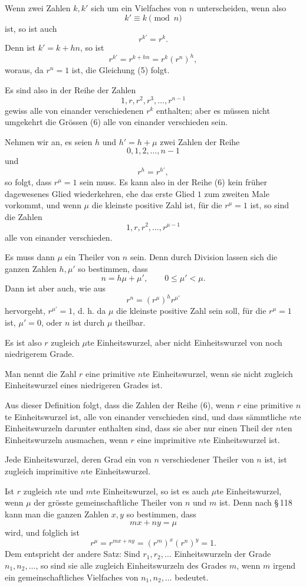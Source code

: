 \documentclass[11pt]{article}
\begin{document}
Wenn zwei Zahlen $k,k'$ sich um ein Vielfaches von $n$ unterscheiden, wenn also
\[
\tag{4}        k'
\equiv k \pmod n
\]
ist, so ist auch
\[
\tag{5}        r^{k'}=r^k.
\]
Denn ist $k'=k+hn$, so ist
\[
        r^{k'}=r^{k+hn}=r^k(r^n)^h,
\]
woraus, da $r^n=1$ ist, die Gleichung (5) folgt.

Es sind also in der Reihe der Zahlen
\[
\tag{6}        1,r,r^2,r^3,\ldots,r^{n-1}
\]
gewiss alle von einander verschiedenen $r^k$ enthalten; aber es müssen nicht umgekehrt die Grössen (6) alle von einander verschieden sein.

Nehmen wir an, es seien $h$ und $h'=h+\mu$ zwei Zahlen der Reihe
\[
        0,1,2,\ldots,n-1
\]
und
\[
        r^h=r^{h'},
\]
so folgt, dass $r^\mu=1$ sein muss. Es kann also in der Reihe (6) kein früher dagewesenes Glied wiederkehren, ehe das erste Glied $1$ zum zweiten Male vorkommt, und wenn $\mu$ die kleinste positive Zahl ist, für die $r^\mu=1$ ist, so sind die Zahlen
\[
\tag{7}        1,r,r^2,\ldots,r^{\mu-1}
\]
alle von einander verschieden.

Es muss dann $\mu$ ein Theiler von $n$ sein. Denn durch Division lassen sich die ganzen Zahlen $h,\mu'$ so bestimmen, dass
\[
        n=h\mu+\mu',\qquad 0\le \mu'<\mu.
\]
Dann ist aber auch, wie aus
\[
        r^n=(r^\mu)^h r^{\mu'}
\]
hervorgeht, $r^{\mu'}=1$, d. h. da $\mu$ die kleinste positive Zahl sein soll, für die $r^\mu=1$ ist, $\mu'=0$, oder $n$ ist durch $\mu$ theilbar.

Es ist also $r$ zugleich $\mu$te Einheitswurzel, aber nicht Einheitswurzel von noch niedrigerem Grade.

Man nennt die Zahl $r$ eine primitive $n$te Einheitswurzel, wenn sie nicht zugleich Einheitswurzel eines niedrigeren Grades ist.

Aus dieser Definition folgt, dass die Zahlen der Reihe (6), wenn $r$ eine primitive $n$te Einheitswurzel ist, alle von einander verschieden sind, und dass sämmtliche $n$te Einheitswurzeln darunter enthalten sind, dass sie aber nur einen Theil der $n$ten Einheitswurzeln ausmachen, wenn $r$ eine imprimitive $n$te Einheitswurzel ist.

Jede Einheitswurzel, deren Grad ein von $n$ verschiedener Theiler von $n$ ist, ist zugleich imprimitive $n$te Einheitswurzel.

Ist $r$ zugleich $n$te und $m$te Einheitswurzel, so ist es auch $\mu$te Einheitswurzel, wenn $\mu$ der grösste gemeinschaftliche Theiler von $n$ und $m$ ist. Denn nach \S\,118 kann man die ganzen Zahlen $x,y$ so bestimmen, dass
\[
        mx+ny=\mu
\]
wird, und folglich ist
\[
        r^\mu=r^{mx+ny}=(r^m)^x(r^n)^y=1.
\]
Dem entspricht der andere Satz: Sind $r_1,r_2,\ldots$ Einheitswurzeln der Grade $n_1,n_2,\ldots$, so sind sie alle zugleich Einheitswurzeln des Grades $m$, wenn $m$ irgend ein gemeinschaftliches Vielfaches von $n_1,n_2,\ldots$ bedeutet.
\end{document}
